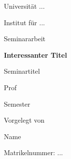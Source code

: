 \begin{titlepage}
	\centering
	\vspace*{1cm}
	
	{\Large Universität ...}\par
	{\Large Institut für ...}\par
	\vspace{2cm}
	
	{\Large Seminararbeit}\par
	\vspace{0.5cm}
	
	{\Huge\bfseries Interessanter Titel}\par
	\vspace{1.5cm}
	
	{\large Seminartitel}\par
	{\large Prof}\par
	{\large Semester}\par
	\vfill
	
	{\large Vorgelegt von}\par
	{\large Name}\par
	{\large Matrikelnummer: ...}\par
	
	\vspace{1cm}
\end{titlepage}

\tableofcontents
\clearpage